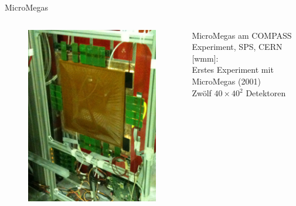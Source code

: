    \begin{frame}{MicroMegas}
       \begin{columns}[T]
			\begin{figure}[htbp]
			  \centering
			  \includegraphics[width=\columnwidth]{bilder/beispiele/micromegas.jpg}
			\end{figure}
			MicroMegas am COMPASS Experiment, SPS, CERN [wmm]:\\
			Erstes Experiment mit MicroMegas (2001)\\
			Zwölf $40\times40$\cm$^2$ Detektoren
			
    \end{columns}

\end{frame}